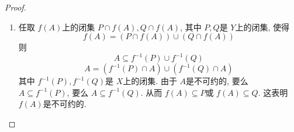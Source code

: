 \documentclass[../main.tex]{subfiles}
\begin{document}
\begin{proof}
\begin{enumerate}
\[        \]
        \item 任取 \(  f\left( A \right)   \)上的闭集 \(  P\cap f\left( A \right), Q\cap f\left( A \right)    \), 其中 \(  P,Q  \)是 \(  Y  \)上的闭集, 使得 \[
        f\left( A \right)= \left( P\cap f\left( A \right)  \right)\cup \left( Q\cap f\left( A \right)  \right)   
        \]   则 \[
        A\subseteq f^{-1} \left( P \right)\cup f^{-1} \left( Q \right)  
        \]         \[
        A= \left( f^{-1} \left( P \right)\cap A  \right)\cup \left( f^{-1} \left( Q \right)\cap A  \right)  
        \]    其中 \(  f^{-1} \left( P \right), f^{-1} \left( Q \right)    \)是 \(  X  \)上的闭集. 由于 \(  A  \)是不可约的, 要么 \(  A\subseteq f^{-1} \left( P \right)   \), 要么 \(  A\subseteq f^{-1} \left( Q \right)   \). 从而 \(  f\left( A \right)\subseteq P   \)或 \(  f\left( A \right)\subseteq Q   \). 这表明 \(  f\left( A \right)   \)是不可约的.        
    \end{enumerate}
    
\end{proof}
\end{document}
